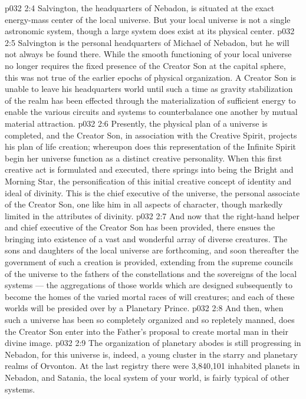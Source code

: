 \vs p032 2:4 Salvington, the headquarters of Nebadon, is situated at the exact energy\hyp{}mass center of the local universe. But your local universe is not a single astronomic system, though a large system does exist at its physical center.
\vs p032 2:5 Salvington is the personal headquarters of Michael of Nebadon, but he will not always be found there. While the smooth functioning of your local universe no longer requires the fixed presence of the Creator Son at the capital sphere, this was not true of the earlier epochs of physical organization. A Creator Son is unable to leave his headquarters world until such a time as gravity stabilization of the realm has been effected through the materialization of sufficient energy to enable the various circuits and systems to counterbalance one another by mutual material attraction.
\vs p032 2:6 \pc Presently, the physical plan of a universe is completed, and the Creator Son, in association with the Creative Spirit, projects his plan of life creation; whereupon does this representation of the Infinite Spirit begin her universe function as a distinct creative personality. When this first creative act is formulated and executed, there springs into being the Bright and Morning Star, the personification of this initial creative concept of identity and ideal of divinity. This is the chief executive of the universe, the personal associate of the Creator Son, one like him in all aspects of character, though markedly limited in the attributes of divinity.
\vs p032 2:7 And now that the right\hyp{}hand helper and chief executive of the Creator Son has been provided, there ensues the bringing into existence of a vast and wonderful array of diverse creatures. The sons and daughters of the local universe are forthcoming, and soon thereafter the government of such a creation is provided, extending from the supreme councils of the universe to the fathers of the constellations and the sovereigns of the local systems --- the aggregations of those worlds which are designed subsequently to become the homes of the varied mortal races of will creatures; and each of these worlds will be presided over by a Planetary Prince.
\vs p032 2:8 And then, when such a universe has been so completely organized and so repletely manned, does the Creator Son enter into the Father’s proposal to create mortal man in their divine image.
\vs p032 2:9 \pc The organization of planetary abodes is still progressing in Nebadon, for this universe is, indeed, a young cluster in the starry and planetary realms of Orvonton. At the last registry there were 3,840,101 inhabited planets in Nebadon, and Satania, the local system of your world, is fairly typical of other systems.

